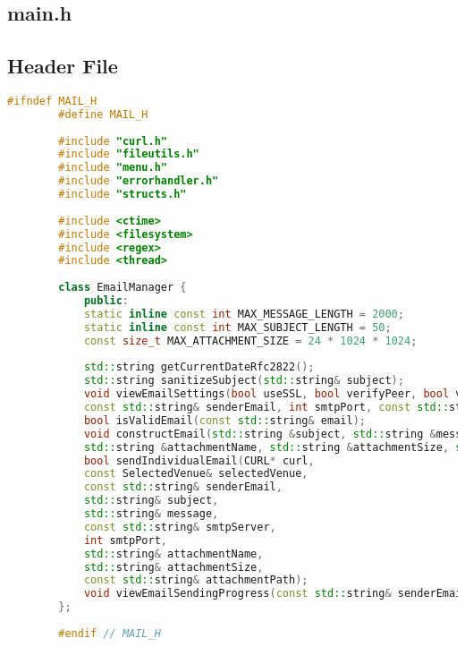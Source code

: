 \documentclass{article}
\begin{document}
	\subsection{main.h}
	
	\subsection*{Header File}
	\begin{lstlisting}[language=C++]
		#ifndef MAIL_H
		#define MAIL_H
		
		#include "curl.h"
		#include "fileutils.h"
		#include "menu.h"
		#include "errorhandler.h"
		#include "structs.h"
		
		#include <ctime>
		#include <filesystem>
		#include <regex>
		#include <thread>
		
		class EmailManager {
			public:
			static inline const int MAX_MESSAGE_LENGTH = 2000;
			static inline const int MAX_SUBJECT_LENGTH = 50;
			const size_t MAX_ATTACHMENT_SIZE = 24 * 1024 * 1024;
			
			std::string getCurrentDateRfc2822();
			std::string sanitizeSubject(std::string& subject);
			void viewEmailSettings(bool useSSL, bool verifyPeer, bool verifyHost, bool verbose,  
			const std::string& senderEmail, int smtpPort, const std::string& smtpServer);
			bool isValidEmail(const std::string& email);
			void constructEmail(std::string &subject, std::string &message, std::string &attachmentPath, 
			std::string &attachmentName, std::string &attachmentSize, std::istream &in = std::cin);
			bool sendIndividualEmail(CURL* curl,
			const SelectedVenue& selectedVenue,
			const std::string& senderEmail,
			std::string& subject,
			std::string& message,
			const std::string& smtpServer,
			int smtpPort,
			std::string& attachmentName,
			std::string& attachmentSize,
			const std::string& attachmentPath);
			void viewEmailSendingProgress(const std::string& senderEmail);
		};
		
		#endif // MAIL_H
	\end{lstlisting}
	
\end{document}
